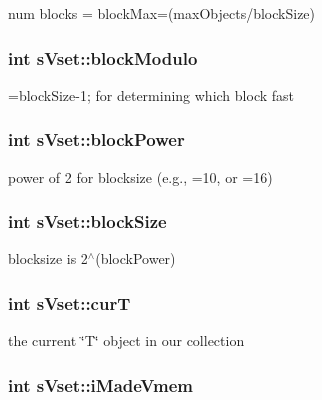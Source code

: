 num blocks = block\+Max=(max\+Objects/block\+Size) 

\subsubsection[{block\+Modulo}]{\setlength{\rightskip}{0pt plus 5cm}int s\+Vset\+::block\+Modulo}\label{a00006_a0b9f1625bf97c1abae2db0346295855b}


=block\+Size-\/1; for determining which block fast 

\subsubsection[{block\+Power}]{\setlength{\rightskip}{0pt plus 5cm}int s\+Vset\+::block\+Power}\label{a00006_add65a271783642c1f7b8b3d872341752}


power of 2 for blocksize (e.\+g., =10, or =16) 

\subsubsection[{block\+Size}]{\setlength{\rightskip}{0pt plus 5cm}int s\+Vset\+::block\+Size}\label{a00006_a5882d40eb0e55fce8c7a8ca9c81bd762}


blocksize is 2$^\wedge$(block\+Power) 

\subsubsection[{cur\+T}]{\setlength{\rightskip}{0pt plus 5cm}int s\+Vset\+::cur\+T}\label{a00006_a9ae2055f85dfdf8a38382e2411e998aa}


the current \char`\"{}\+T\char`\"{} object in our collection 

\subsubsection[{i\+Made\+Vmem}]{\setlength{\rightskip}{0pt plus 5cm}int s\+Vset\+::i\+Made\+Vmem}\label{a00006_a3e514600e95b3a94ba65bd4954965b97}



